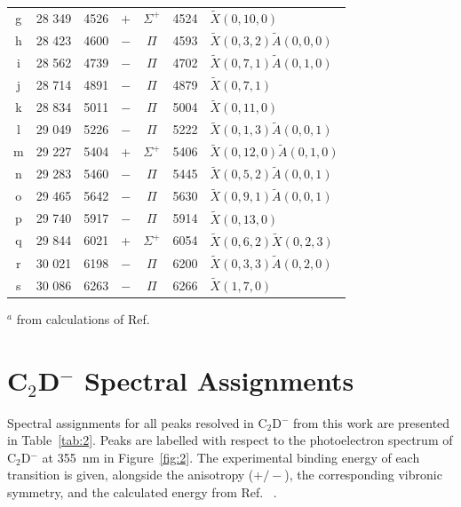 \documentclass[journal=jacsat,manuscript=suppinfo]{achemso}
\newcommand{\onlinecite}[1]{\hspace{-1 ex} \nocite{#1}\citenum{#1}}
\begin{document}
\begin{table}
\begin{tabular}{c c c c c c l}
		g & 28 349 & 4526 & $+$ & $\Sigma^+$ & 4524 & $\tilde{X}(0,10,0)$  \\
		h  & 28 423 & 4600 & $-$ & $\Pi$ & 4593 & $\tilde{X}(0,3,2)\tilde{A}(0,0,0)$  \\
		i & 28 562 & 4739 & $-$ & $\Pi$ & 4702 & $\tilde{X}(0,7,1)\tilde{A}(0,1,0)$  \\
		j & 28 714 & 4891 & $-$ & $\Pi$ & 4879 & $\tilde{X}(0,7,1)$  \\
		k   & 28 834 & 5011 & $-$ & $\Pi$ & 5004 & $\tilde{X}(0,11,0)$  \\  
		l & 29 049 & 5226 & $-$ & $\Pi$ & 5222 & $\tilde{X}(0,1,3)\tilde{A}(0,0,1)$  \\
		m & 29 227 & 5404 & + & $\Sigma^+$ & 5406 & $\tilde{X}(0,12,0)\tilde{A}(0,1,0)$ \\
		n & 29 283 & 5460 & $-$ & $\Pi$ & 5445  & $\tilde{X}(0,5,2)\tilde{A}(0,0,1)$  \\
		o & 29 465 & 5642 & $-$ & $\Pi$ & 5630  & $\tilde{X}(0,9,1)\tilde{A}(0,0,1)$  \\
		p  & 29 740 & 5917 & $-$ & $\Pi$ & 5914 & $\tilde{X}(0,13,0)$ \\
		q & 29 844 & 6021 & + & $\Sigma^+$ & 6054 & $\tilde{X}(0,6,2)\tilde{X}(0,2,3)$ \\
		r & 30 021 & 6198 & $-$ & $\Pi$ & 6200 & $\tilde{X}(0,3,3)\tilde{A}(0,2,0)$ \\
		s & 30 086 & 6263 & $-$ & $\Pi$ & 6266 & $\tilde{X}(1,7,0)$ \\
	\end{tabular}
	\raggedright

$^a$ from calculations of Ref.~\onlinecite{tar03}
	
\end{table}

\section{C$_2$D$^-$ Spectral Assignments}
Spectral assignments for all peaks resolved in C$_2$D$^-$ from this work are presented in Table~\ref{tab:2}. Peaks are labelled with respect to the photoelectron spectrum of C$_2$D$^-$ at 355~nm in Figure~\ref{fig:2}. The experimental binding energy of each transition is given, alongside the anisotropy ($+/-$), the corresponding vibronic symmetry, and the calculated energy from Ref.~\onlinecite{tar03}. 
\end{document}
